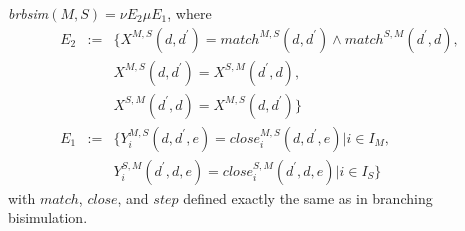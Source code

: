\documentclass{article}
\begin{document}
\emph{brbsim}$(M,S)=\nu E_{2}\mu E_{1}$, where%
\begin{equation*}
\begin{array}{ccl}
E_{2} & := & \{X^{M,S}(d,d^{\prime })=match^{M,S}(d,d^{\prime })\wedge
match^{S,M}(d^{\prime },d), \\
&  & X^{M,S}(d,d^{\prime })=X^{S,M}(d^{\prime },d), \\
&  & X^{S,M}(d^{\prime },d)=X^{M,S}(d,d^{\prime })\} \\
E_{1} & := & \{Y_{i}^{M,S}(d,d^{\prime },e)=close_{i}^{M,S}(d,d^{\prime
},e)|i\in I_{M}, \\
&  & Y_{i}^{S,M}(d^{\prime },d,e)=close_{i}^{S,M}(d^{\prime },d,e)|i\in
I_{S}\}%
\end{array}%
\end{equation*}%
with $match$, $close$, and $step$ defined exactly the same as in branching
bisimulation.
\end{document}
